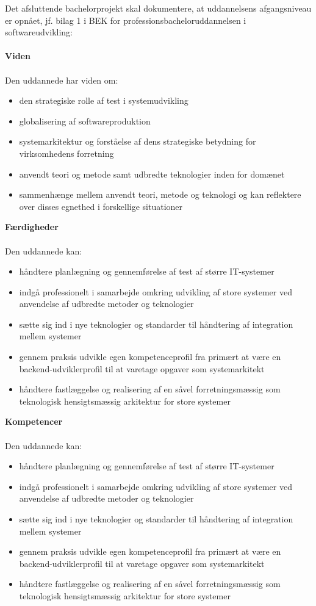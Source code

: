 \documentclass[11pt]{article}
\begin{document}
Det afsluttende bachelorprojekt skal dokumentere, at uddannelsens afgangsniveau er opnået, jf. bilag 1 i BEK for professionsbacheloruddannelsen i softwareudvikling: \\
\\
\textbf{Viden} \cite{cphbusiness}\\ \\
Den uddannede har viden om:
\begin{itemize}
\item den strategiske rolle af test i systemudvikling
\item globalisering af softwareproduktion
\item systemarkitektur og forståelse af dens strategiske betydning for virksomhedens forretning
\item anvendt teori og metode samt udbredte teknologier inden for domænet
\item sammenhænge mellem anvendt teori, metode og teknologi og kan reflektere over disses egnethed i forskellige situationer
\end{itemize}
\vspace{1cm}
\textbf{Færdigheder} \cite{cphbusiness} \\ \\
Den uddannede kan:
\begin{itemize}
\item håndtere planlægning og gennemførelse af test af større IT-systemer
\item indgå professionelt i samarbejde omkring udvikling af store systemer ved anvendelse af udbredte metoder og teknologier
\item sætte sig ind i nye teknologier og standarder til håndtering af integration mellem systemer

\item gennem praksis udvikle egen kompetenceprofil fra primært at være en backend-udviklerprofil til at varetage opgaver som
systemarkitekt
\item håndtere fastlæggelse og realisering af en såvel forretningsmæssig som teknologisk hensigtsmæssig arkitektur for store systemer

\end{itemize}
\vspace{1cm}
\clearpage
\textbf{Kompetencer} \cite{cphbusiness} \\
\\
Den uddannede kan:
\begin{itemize}
\item håndtere planlægning og gennemførelse af test af større IT-systemer
\item indgå professionelt i samarbejde omkring udvikling af store systemer ved
anvendelse af udbredte metoder og teknologier
\item sætte sig ind i nye teknologier og standarder til håndtering af integration
mellem systemer
\item gennem praksis udvikle egen kompetenceprofil fra primært at være en
backend-udviklerprofil til at varetage opgaver som systemarkitekt
\item håndtere fastlæggelse og realisering af en såvel forretningsmæssig som
teknologisk hensigtsmæssig arkitektur for store systemer
\end{itemize}

\clearpage


\end{document}
